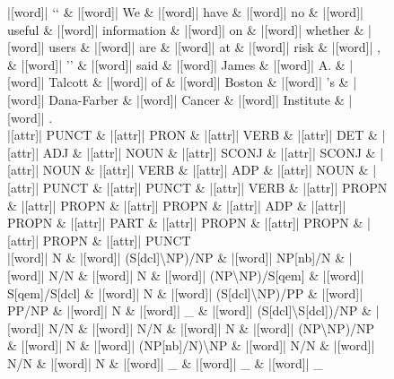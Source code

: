 \documentclass[10pt,a4paper]{article}
\begin{document}
\begin{figure}[h]
{\begin{dependency}[theme = simple]
\begin{deptext}[column sep=1em, row sep=0.1em]
|[word]| {}`{}` \& |[word]| We \& |[word]| have \& |[word]| no \& |[word]| useful \& |[word]| information \& |[word]| on \& |[word]| whether \& |[word]| users \& |[word]| are \& |[word]| at \& |[word]| risk \& |[word]| , \& |[word]| '' \& |[word]| said \& |[word]| James \& |[word]| A. \& |[word]| Talcott \& |[word]| of \& |[word]| Boston \& |[word]| 's \& |[word]| Dana-Farber \& |[word]| Cancer \& |[word]| Institute \& |[word]| . \\
|[attr]| PUNCT \& |[attr]| PRON \& |[attr]| VERB \& |[attr]| DET \& |[attr]| ADJ \& |[attr]| NOUN \& |[attr]| SCONJ \& |[attr]| SCONJ \& |[attr]| NOUN \& |[attr]| VERB \& |[attr]| ADP \& |[attr]| NOUN \& |[attr]| PUNCT \& |[attr]| PUNCT \& |[attr]| VERB \& |[attr]| PROPN \& |[attr]| PROPN \& |[attr]| PROPN \& |[attr]| ADP \& |[attr]| PROPN \& |[attr]| PART \& |[attr]| PROPN \& |[attr]| PROPN \& |[attr]| PROPN \& |[attr]| PUNCT \\
|[word]| N \& |[word]| (S{[}dcl{]}\textbackslash{}NP)/NP \& |[word]| NP{[}nb{]}/N \& |[word]| N/N \& |[word]| N \& |[word]| (NP\textbackslash{}NP)/S{[}qem{]} \& |[word]| S{[}qem{]}/S{[}dcl{]} \& |[word]| N \& |[word]| (S{[}dcl{]}\textbackslash{}NP)/PP \& |[word]| PP/NP \& |[word]| N \& |[word]| \_ \& |[word]| (S{[}dcl{]}\textbackslash{}S{[}dcl{]})/NP \& |[word]| N/N \& |[word]| N/N \& |[word]| N \& |[word]| (NP\textbackslash{}NP)/NP \& |[word]| N \& |[word]| (NP{[}nb{]}/N)\textbackslash{}NP \& |[word]| N/N \& |[word]| N/N \& |[word]| N \& |[word]| \_ \& |[word]| \_ \& |[word]| \_ \\
\end{deptext}




\end{dependency}}
\end{figure}
\end{document}
